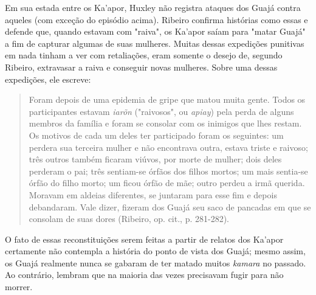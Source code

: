 Em sua estada entre os Ka'apor, Huxley não registra ataques dos Guajá
contra aqueles (com exceção do episódio acima). Ribeiro confirma
histórias como essas e defende que, quando estavam com "raiva", os
Ka'apor saíam para "matar Guajá" a fim de capturar algumas de suas
mulheres. Muitas dessas expedições punitivas em nada tinham a ver com
retaliações, eram somente o desejo de, segundo Ribeiro, extravasar a
raiva e conseguir novas mulheres. Sobre uma dessas expedições, ele
escreve:

\begin{quote}
Foram depois de uma epidemia de gripe que matou muita gente. Todos os
participantes estavam \emph{iarõn} ("raivosos", ou \emph{apiay}) pela
perda de alguns membros da família e foram se consolar com os inimigos
que lhes restam. Os motivos de cada um deles ter participado foram os
seguintes: um perdera sua terceira mulher e não encontrava outra, estava
triste e raivoso; três outros também ficaram viúvos, por morte de
mulher; dois deles perderam o pai; três sentiam-se órfãos dos filhos
mortos; um mais sentia-se órfão do filho morto; um ficou órfão de mãe;
outro perdeu a irmã querida. Moravam em aldeias diferentes, se juntaram
para esse fim e depois debandaram. Vale dizer, fizeram dos Guajá seu
saco de pancadas em que se consolam de suas dores (Ribeiro, op. cit.,
p. 281-282).
\end{quote}

O fato de essas reconstituições serem feitas a partir de relatos dos
Ka'apor certamente não contempla a história do ponto de vista dos Guajá;
mesmo assim, os Guajá realmente nunca se gabaram de ter matado muitos
\emph{kamara} no passado. Ao contrário, lembram que na maioria das vezes
precisavam fugir para não morrer.

